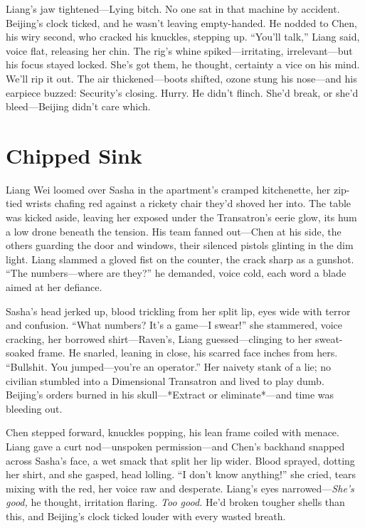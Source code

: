 \documentclass[12pt]{book}
\begin{document}
Liang’s jaw tightened—Lying bitch. No one sat in that machine by accident. Beijing’s clock ticked, and he wasn’t leaving empty-handed. He nodded to Chen, his wiry second, who cracked his knuckles, stepping up. “You’ll talk,” Liang said, voice flat, releasing her chin. The rig’s whine spiked—irritating, irrelevant—but his focus stayed locked. She’s got them, he thought, certainty a vice on his mind. We’ll rip it out. The air thickened—boots shifted, ozone stung his nose—and his earpiece buzzed: Security’s closing. Hurry. He didn’t flinch. She’d break, or she’d bleed—Beijing didn’t care which.

\section{Chipped Sink}

Liang Wei loomed over Sasha in the apartment’s cramped kitchenette, her zip-tied wrists chafing red against a rickety chair they’d shoved her into. The table was kicked aside, leaving her exposed under the Transatron’s eerie glow, its hum a low drone beneath the tension. His team fanned out—Chen at his side, the others guarding the door and windows, their silenced pistols glinting in the dim light. Liang slammed a gloved fist on the counter, the crack sharp as a gunshot. “The numbers—where are they?” he demanded, voice cold, each word a blade aimed at her defiance.

Sasha’s head jerked up, blood trickling from her split lip, eyes wide with terror and confusion. “What numbers? It’s a game—I swear!” she stammered, voice cracking, her borrowed shirt—Raven’s, Liang guessed—clinging to her sweat-soaked frame. He snarled, leaning in close, his scarred face inches from hers. “Bullshit. You jumped—you’re an operator.” Her naivety stank of a lie; no civilian stumbled into a Dimensional Transatron and lived to play dumb. Beijing’s orders burned in his skull—*Extract or eliminate*—and time was bleeding out.

Chen stepped forward, knuckles popping, his lean frame coiled with menace. Liang gave a curt nod—unspoken permission—and Chen’s backhand snapped across Sasha’s face, a wet smack that split her lip wider. Blood sprayed, dotting her shirt, and she gasped, head lolling. “I don’t know anything!” she cried, tears mixing with the red, her voice raw and desperate. Liang’s eyes narrowed—\textit{She’s good,} he thought, irritation flaring. \textit{Too good.} He’d broken tougher shells than this, and Beijing’s clock ticked louder with every wasted breath.
\end{document}
